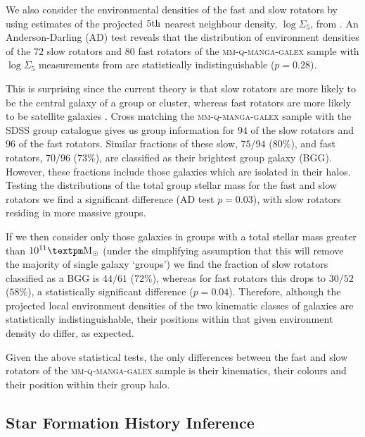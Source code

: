 \documentclass[useAMS,usenatbib]{mn2e}
\begin{document}
We also consider the environmental densities of the fast and slow rotators by using estimates of the projected $5\rm{th}$ nearest neighbour density,  $\log\Sigma_5$, from \cite{bamford09}. An Anderson-Darling (AD) test reveals that the distribution of environment densities of the $72$ slow rotators and $80$ fast rotators of the \textsc{mm-q-manga-galex} sample with $\log\Sigma_5$ measurements from \cite{bamford09} are statistically indistinguishable ($p=0.28$). 

This is surprising since the current theory is that slow rotators are more likely to be the central galaxy of a group or cluster, whereas fast rotators are more likely to be satellite galaxies \citep{cappellari11, deugenio13, houghton13, scott14}. Cross matching the \textsc{mm-q-manga-galex} sample with the \cite{yang09} SDSS group catalogue gives us group information for $94$ of the slow rotators and $96$ of the fast rotators. Similar fractions of these slow, $75/94$ ($80\%$), and fast rotators, $70/96$ ($73\%$), are classified as their brightest group galaxy (BGG). However, these fractions include those galaxies which are isolated in their halos. Testing the distributions of the total group stellar mass for the fast and slow rotators we find a significant difference (AD test $p=0.03$), with slow rotators residing in more massive groups. 

If we then consider only those galaxies in groups with a total stellar mass greater than $10^{11}±\rm{M}_{\odot}$ (under the simplifying assumption that this will remove the majority of single galaxy `groups') we find the fraction of slow rotators classified as a BGG is $44/61$ ($72\%$), whereas for fast rotators this drops to $30/52$ ($58\%$), a statistically significant difference ($p=0.04$). Therefore, although the projected local environment densities of the two kinematic classes of galaxies are statistically indistinguishable, their positions within that given environment density do differ, as expected. 

Given the above statistical tests, the only differences between the fast and slow rotators of the \textsc{mm-q-manga-galex} sample is their kinematics, their colours and their position within their group halo.


\subsection{Star Formation History Inference}\label{sec:starpy}
\end{document}
